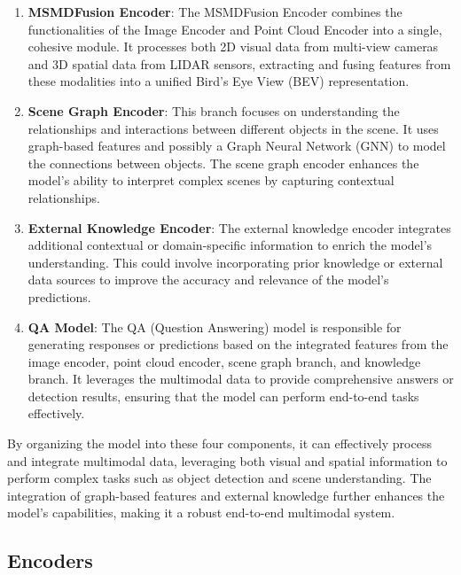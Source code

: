 \documentclass{article} %
\begin{document}
	\begin{enumerate}
		
		
		\item \textbf{MSMDFusion Encoder}: The MSMDFusion Encoder combines the functionalities of the Image Encoder and Point Cloud Encoder into a single, cohesive module. It processes both 2D visual data from multi-view cameras and 3D spatial data from LIDAR sensors, extracting and fusing features from these modalities into a unified Bird's Eye View (BEV) representation.
		
		\item \textbf{Scene Graph Encoder}: This branch focuses on understanding the relationships and interactions between different objects in the scene. It uses graph-based features and possibly a Graph Neural Network (GNN) to model the connections between objects. The scene graph encoder enhances the model's ability to interpret complex scenes by capturing contextual relationships.
		
		\item \textbf{External Knowledge Encoder}: The external knowledge encoder integrates additional contextual or domain-specific information to enrich the model's understanding. This could involve incorporating prior knowledge or external data sources to improve the accuracy and relevance of the model's predictions.
		
		\item \textbf{QA Model}: The QA (Question Answering) model is responsible for generating responses or predictions based on the integrated features from the image encoder, point cloud encoder, scene graph branch, and knowledge branch. It leverages the multimodal data to provide comprehensive answers or detection results, ensuring that the model can perform end-to-end tasks effectively.
	\end{enumerate}
	
	By organizing the model into these four components, it can effectively process and integrate multimodal data, leveraging both visual and spatial information to perform complex tasks such as object detection and scene understanding. The integration of graph-based features and external knowledge further enhances the model's capabilities, making it a robust end-to-end multimodal system.
	
	\subsection{ Encoders }
	
\end{document}
